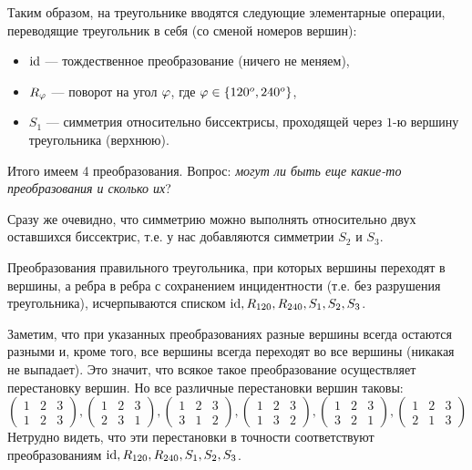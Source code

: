 Таким образом, на треугольнике вводятся следующие элементарные операции, переводящие треугольник в себя (со сменой номеров вершин):
\begin{itemize}
\item $\mathrm{id}$ --- тождественное преобразование (ничего не меняем),
\item $R_\varphi$ --- поворот на угол $\varphi$, где $\varphi\in\{120^o,240^o\}$,
\item $S_1$ --- симметрия относительно биссектрисы, проходящей через $1$-ю вершину треугольника (верхнюю).
\end{itemize}

Итого имеем 4 преобразования. Вопрос: \textit{могут ли быть еще какие-то преобразования и сколько их}?

Сразу же очевидно, что симметрию можно выполнять относительно двух оставшихся биссектрис, т.е. у нас добавляются симметрии $S_2$ и $S_3$.

\begin{thrm}
Преобразования правильного треугольника, при которых вершины переходят в вершины, а ребра в ребра с сохранением инцидентности (т.е. без разрушения треугольника), исчерпываются списком $\mathrm{id}, R_{120}, R_{240}, S_1, S_2, S_3$.
\end{thrm}
\pf
Заметим, что при указанных преобразованиях разные вершины всегда остаются разными и, кроме того, все вершины всегда переходят во все вершины (никакая не выпадает). Это значит, что всякое такое преобразование осуществляет перестановку вершин. Но все различные перестановки вершин таковы:
$$
\begin{pmatrix}
1 & 2 & 3 \\
1 & 2 & 3
\end{pmatrix},
\begin{pmatrix}
1 & 2 & 3 \\
2 & 3 & 1
\end{pmatrix},
\begin{pmatrix}
1 & 2 & 3 \\
3 & 1 & 2
\end{pmatrix},
\begin{pmatrix}
1 & 2 & 3 \\
1 & 3 & 2
\end{pmatrix},
\begin{pmatrix}
1 & 2 & 3 \\
3 & 2 & 1
\end{pmatrix},
\begin{pmatrix}
1 & 2 & 3 \\
2 & 1 & 3
\end{pmatrix}
$$
Нетрудно видеть, что эти перестановки в точности соответствуют преобразованиям $\mathrm{id}, R_{120}, R_{240}, S_1, S_2, S_3$.
\epf

